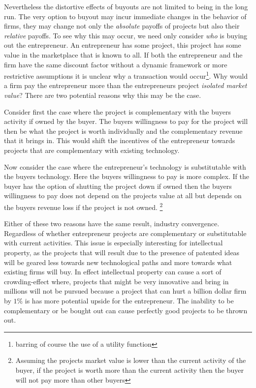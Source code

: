 Nevertheless the distortive effects of buyouts are not limited to being in the long run. The very option to buyout may incur immediate changes in the behavior of firms, they may change not only the \textit{absolute} payoffs of projects but also their \textit{relative} payoffs. To see why this may occur, we need only consider \textit{who} is buying out the entrepreneur. An entrepreneur has some project, this project has some value in the marketplace that is known to all. If both the entrepreneur and the firm have the same discount factor without a dynamic framework or more restrictive assumptions it is unclear why a transaction would occur\footnote{barring of course the use of a utility function}. Why would a firm pay the entrepreneur more than the entrepreneurs project \textit{isolated market value}?  There are two potential reasons why this may be the case.


Consider first the case where the project is complementary with the buyers activity if owned by the buyer. The buyers willingness to pay for the project will then be what the project is worth individually and the complementary revenue that it brings in. This would shift the incentives of the entrepreneur towards projects that are complementary with existing technology. 

Now consider the case where the entrepreneur's technology is substitutable with the buyers technology. Here the buyers willingness to pay is more complex. If the buyer has the option of shutting the project down if owned then the buyers willingness to pay does not depend on the projects value at all but depends on the buyers revenue loss if the project is not owned. \footnote{Assuming the projects market value is lower than the current activity of the buyer, if the project is worth more than the current activity then the buyer will not pay more than other buyers}

Either of these two reasons have the same result, industry convergence. Regardless of whether entrepreneur projects are complementary or substitutable with current activities. This issue is especially interesting for intellectual property, as the projects that will result due to the presence of patented ideas will be geared less towards new technological paths and more towards what existing firms will buy. In effect intellectual property can cause a sort of crowding-effect where, projects that might be very innovative and bring in millions will not be pursued because a project that can hurt a billion dollar firm by $1\%$ is has more potential upside for the entrepreneur. The inability to be complementary or be bought out can cause perfectly good projects to be thrown out. 

